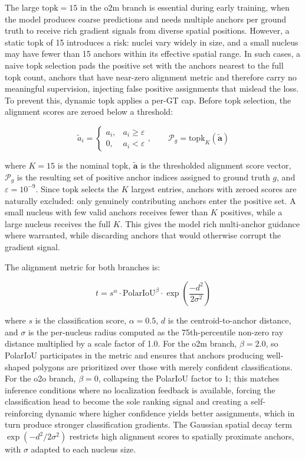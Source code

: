 The large $\text{topk} = 15$ in the o2m branch is essential during early training, when the model produces coarse predictions and needs multiple anchors per ground truth to receive rich gradient signals from diverse spatial positions. However, a static topk of 15 introduces a risk: nuclei vary widely in size, and a small nucleus may have fewer than 15 anchors within its effective spatial range. In such cases, a naive topk selection pads the positive set with the anchors nearest to the full topk count, anchors that have near-zero alignment metric and therefore carry no meaningful supervision, injecting false positive assignments that mislead the loss. To prevent this, dynamic topk applies a per-GT cap. Before topk selection, the alignment scores are zeroed below a threshold:

\begin{equation}
    \tilde{a}_i =
    \begin{cases}
        a_i, & a_i \geq \varepsilon \\
        0,   & a_i < \varepsilon
    \end{cases}
    ,\qquad
    \mathcal{P}_g = \text{topk}_{K}(\tilde{\mathbf{a}})
\end{equation}

where $K = 15$ is the nominal topk, $\tilde{\mathbf{a}}$ is the thresholded alignment score vector, $\mathcal{P}_g$ is the resulting set of positive anchor indices assigned to ground truth $g$, and $\varepsilon = 10^{-9}$. Since $\text{topk}$ selects the $K$ largest entries, anchors with zeroed scores are naturally excluded: only genuinely contributing anchors enter the positive set. A small nucleus with few valid anchors receives fewer than $K$ positives, while a large nucleus receives the full $K$. This gives the model rich multi-anchor guidance where warranted, while discarding anchors that would otherwise corrupt the gradient signal.

The alignment metric for both branches is:

\begin{equation}
    t = s^{\alpha} \cdot \text{PolarIoU}^{\beta} \cdot \exp\!\left(\frac{-d^2}{2\sigma^2}\right)
\end{equation}

where $s$ is the classification score, $\alpha = 0.5$, $d$ is the centroid-to-anchor distance, and $\sigma$ is the per-nucleus radius computed as the 75th-percentile non-zero ray distance multiplied by a scale factor of 1.0. For the o2m branch, $\beta = 2.0$, so PolarIoU participates in the metric and ensures that anchors producing well-shaped polygons are prioritized over those with merely confident classifications. For the o2o branch, $\beta = 0$, collapsing the PolarIoU factor to 1; this matches inference conditions where no localization feedback is available, forcing the classification head to become the sole ranking signal and creating a self-reinforcing dynamic where higher confidence yields better assignments, which in turn produce stronger classification gradients. The Gaussian spatial decay term $\exp(-d^2 / 2\sigma^2)$ restricts high alignment scores to spatially proximate anchors, with $\sigma$ adapted to each nucleus size.

